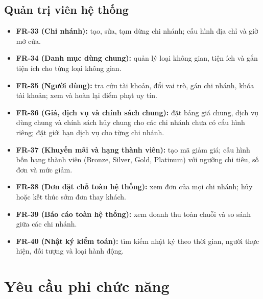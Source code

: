 \subsection{Quản trị viên hệ thống}
\begin{itemize}
    \item \textbf{FR-33 (Chi nhánh):} tạo, sửa, tạm dừng chi nhánh; cấu hình địa chỉ và giờ mở cửa.
    \item \textbf{FR-34 (Danh mục dùng chung):} quản lý loại không gian, tiện ích và gắn tiện ích cho từng loại không gian.
    \item \textbf{FR-35 (Người dùng):} tra cứu tài khoản, đổi vai trò, gán chi nhánh, khóa tài khoản; xem và hoàn lại điểm phạt uy tín.
    \item \textbf{FR-36 (Giá, dịch vụ và chính sách chung):} đặt bảng giá chung, dịch vụ dùng chung và chính sách hủy chung cho các chi nhánh chưa có cấu hình riêng; đặt giới hạn dịch vụ cho từng chi nhánh.
    \item \textbf{FR-37 (Khuyến mãi và hạng thành viên):} tạo mã giảm giá; cấu hình bốn hạng thành viên (Bronze, Silver, Gold, Platinum) với ngưỡng chi tiêu, số đơn và mức giảm.
    \item \textbf{FR-38 (Đơn đặt chỗ toàn hệ thống):} xem đơn của mọi chi nhánh; hủy hoặc kết thúc sớm đơn thay khách.
    \item \textbf{FR-39 (Báo cáo toàn hệ thống):} xem doanh thu toàn chuỗi và so sánh giữa các chi nhánh.
    \item \textbf{FR-40 (Nhật ký kiểm toán):} tìm kiếm nhật ký theo thời gian, người thực hiện, đối tượng và loại hành động.
\end{itemize}

\section{Yêu cầu phi chức năng}
\label{sec:yeucau_phichucnang}

